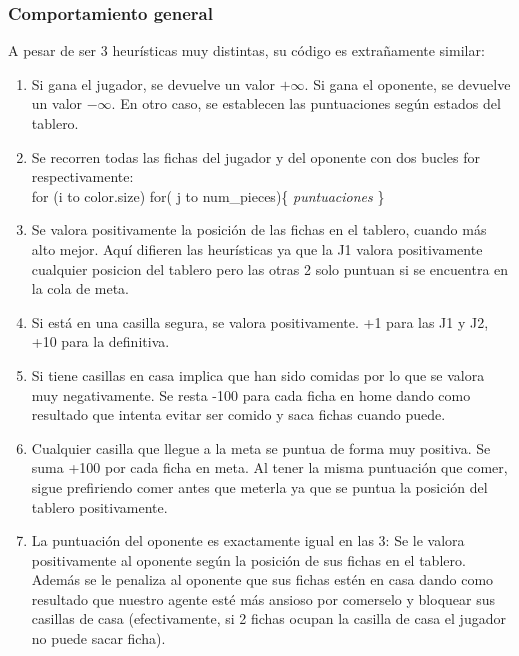 \documentclass[12pt, spanish]{article}
\begin{document}
\subsubsection{Comportamiento general}
A pesar de ser 3 heurísticas muy distintas, su código es extrañamente similar:
\begin{enumerate}
 \item Si gana el jugador, se devuelve un valor $+\infty$. Si gana el oponente, se devuelve un valor $-\infty$. En otro caso, se establecen las puntuaciones según estados del tablero.

 \item Se recorren todas las fichas del jugador y del oponente con dos bucles for respectivamente: \\ for (i to color.size) for( j to num\_pieces)\{ \emph{puntuaciones} \}

 \item Se valora positivamente la posición de las fichas en el tablero, cuando más alto mejor. Aquí difieren las heurísticas ya que la J1 valora positivamente cualquier posicion del tablero pero las otras 2 solo puntuan si se encuentra en la cola de meta.

 \item Si está en una casilla segura, se valora positivamente. +1 para las J1 y J2, +10 para la definitiva.

 \item Si tiene casillas en casa implica que han sido comidas por lo que se valora muy negativamente. Se resta -100 para cada ficha en home dando como resultado que intenta evitar ser comido y saca fichas cuando puede.

 \item Cualquier casilla que llegue a la meta se puntua de forma muy positiva. Se suma +100 por cada ficha en meta. Al tener la misma puntuación que comer, sigue prefiriendo comer antes que meterla ya que se puntua la posición del tablero positivamente.

 \item La puntuación del oponente es exactamente igual en las 3: Se le valora positivamente al oponente según la posición de sus fichas en el tablero. Además se le penaliza al oponente que sus fichas estén en casa dando como resultado que nuestro agente esté más ansioso por comerselo y bloquear sus casillas de casa (efectivamente, si 2 fichas ocupan la casilla de casa el jugador no puede sacar ficha).


\end{enumerate}
\end{document}
